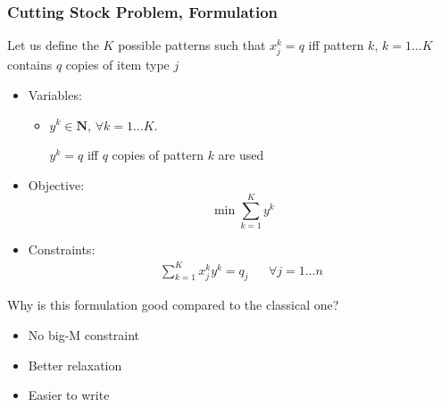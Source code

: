 \documentclass[10pt]{beamer}
\newcommand{\N}{\mathbf{N}}
\begin{document}
\begin{frame}
  \frametitle{Cutting Stock Problem, Formulation}

  Let us define the $K$ possible patterns such that $x_j^k = q$ iff pattern $k$, $k = 1 \dots K$ contains $q$ copies of item type $j$

  \begin{itemize}
    \item Variables:
      \begin{itemize}
        \item $y^k \in \N$,
          $\forall k = 1 \dots K$.

          $y^k = q$ iff $q$ copies of pattern $k$ are used
      \end{itemize}

    \item Objective:
      \begin{displaymath}
        \min \sum_{k = 1}^{K} y^k
      \end{displaymath}

    \item Constraints:
      \begin{align*}
        \sum_{k = 1}^{K} x_j^k y^k = q_j && \forall j = 1 \dots n \
      \end{align*}
  \end{itemize}

  \pause Why is this formulation good compared to the classical one?
  \begin{itemize}
    \item \pause No big-M constraint
    \item Better relaxation
    \item Easier to write
  \end{itemize}
\end{frame}

\def\mystar#1#2#3#4#5#6#7{
  \begin{scope}[shift={(#2,#1)},opacity=#7,transparency group]
    \draw[line width=1pt,color=blue,arrows={Bracket-Bracket}] (0.4,0) -- +(#3,0);
    \draw[line width=5pt,color=red] (0.4,0) ++(#4,0) -- ++(#5,0);
    \def\tmp{#6}\if\tmp\empty\else
    \node[star, star point height=3mm, minimum size=5mm, color=yellow, fill=yellow, text=black,scale=.4] at (0,0) {#6};
    \fi
  \end{scope}
}

\def\mystaronly#1#2#3#4{
  \begin{scope}[shift={(#2,#1)},opacity=#4,transparency group]
    \node[star, star point height=3mm, minimum size=5mm, color=yellow, fill=yellow, text=black,scale=.4] at (0,0) {#3};
  \end{scope}
}
\end{document}
